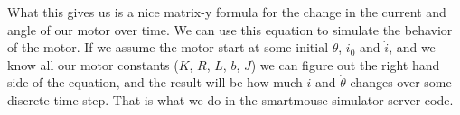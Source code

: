 \documentclass{article}
\begin{document}
What this gives us is a nice matrix-y formula for the change in the current and angle of our motor over time. We can use this equation to simulate the behavior of the motor. If we assume the motor start at some initial $\dot{\theta}$, $i_0$ and $\dot{i}$, and we know all our motor constants ($K$, $R$, $L$, $b$, $J$) we can figure out the right hand side of the equation, and the result will be how much $i$ and $\dot{\theta}$ changes over some discrete time step. That is what we do in the smartmouse simulator server code.
\end{document}
